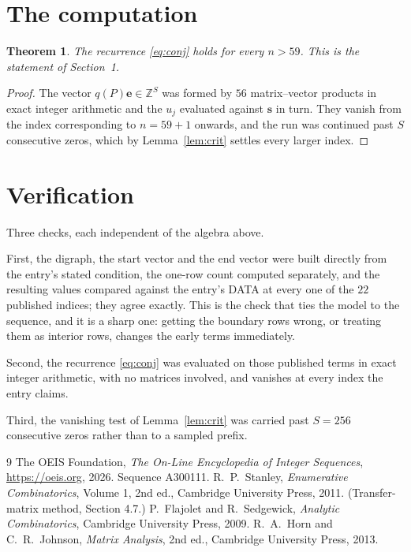 \documentclass[11pt,a4paper]{article}
\theoremstyle{plain}
\newtheorem{theorem}{Theorem}
\theoremstyle{definition}
\begin{document}
\section{The computation}

\begin{theorem}
The recurrence \eqref{eq:conj} holds for every $n>59$. This is the statement of
Section~1.
\end{theorem}

\begin{proof}
The vector $q(P)\mathbf{e}\in\mathbb{Z}^{S}$ was formed by $56$ matrix--vector
products in exact integer arithmetic and the $u_j$ evaluated against $\mathbf{s}$ in turn.
They vanish from the index corresponding to $n=59+1$ onwards, and the run was continued
past $S$ consecutive zeros, which by Lemma~\ref{lem:crit} settles every larger index.
\end{proof}

\section{Verification}

Three checks, each independent of the algebra above.

First, the digraph, the start vector and the end vector were built directly from the
entry's stated condition, the one-row count computed separately, and the resulting values
compared against the entry's DATA at every one of the $22$ published indices; they
agree exactly. This is the check that ties the model to the sequence, and it is a sharp one:
getting the boundary rows wrong, or treating them as interior rows, changes the early terms
immediately.

Second, the recurrence \eqref{eq:conj} was evaluated on those published terms in exact
integer arithmetic, with no matrices involved, and vanishes at every index the entry claims.

Third, the vanishing test of Lemma~\ref{lem:crit} was carried past $S=256$ consecutive
zeros rather than to a sampled prefix.

\begin{thebibliography}{9}
 The OEIS Foundation, \emph{The On-Line Encyclopedia of Integer
Sequences}, \url{https://oeis.org}, 2026. Sequence A300111.
 R.~P.~Stanley, \emph{Enumerative Combinatorics}, Volume 1, 2nd ed.,
Cambridge University Press, 2011. (Transfer-matrix method, Section 4.7.)
 P.~Flajolet and R.~Sedgewick, \emph{Analytic Combinatorics}, Cambridge
University Press, 2009.
 R.~A.~Horn and C.~R.~Johnson, \emph{Matrix Analysis}, 2nd ed., Cambridge
University Press, 2013.
\end{thebibliography}
\end{document}
